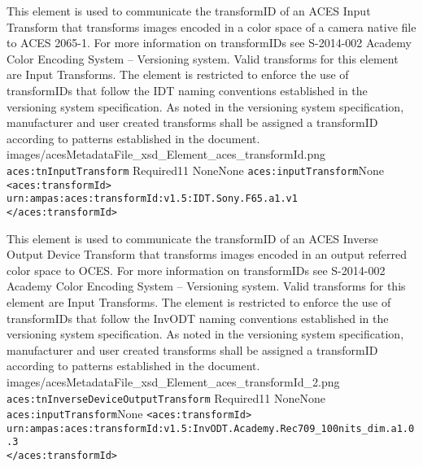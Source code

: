         {This element is used to communicate the transformID of an ACES Input Transform that transforms images encoded in a color space of a camera native file to ACES 2065-1.  For more information on transformIDs see S-2014-002 Academy Color Encoding System -- Versioning system.  Valid transforms for this element are Input Transforms.  The element is restricted to enforce the use of transformIDs that follow the IDT naming conventions established in the versioning system specification.  As noted in the versioning system specification, manufacturer and user created transforms shall be assigned a transformID according to patterns established in the document.}
        {images/acesMetadataFile_xsd_Element_aces_transformId.png}
        {\texttt{aces:tnInputTransform}}
        {Required}{1}{1}
        {None}{None}
        {\texttt{aces:inputTransform}}{None}
        {\lstinline{<aces:transformId>} \\
        \lstinline{urn:ampas:aces:transformId:v1.5:IDT.Sony.F65.a1.v1} \\
        \lstinline{</aces:transformId>}}

        {This element is used to communicate the transformID of an ACES Inverse Output Device Transform that transforms images encoded in an output referred color space to OCES.  For more information on transformIDs see S-2014-002 Academy Color Encoding System -- Versioning system.  Valid transforms for this element are Input Transforms.  The element is restricted to enforce the use of transformIDs that follow the InvODT naming conventions established in the versioning system specification.  As noted in the versioning system specification, manufacturer and user created transforms shall be assigned a transformID according to patterns established in the document.}
        {images/acesMetadataFile_xsd_Element_aces_transformId_2.png}
        {\texttt{aces:tnInverseDeviceOutputTransform}}
        {Required}{1}{1}
        {None}{None}
        {\texttt{aces:inputTransform}}{None}
        {\lstinline{<aces:transformId>} \\
        \lstinline{urn:ampas:aces:transformId:v1.5:InvODT.Academy.Rec709_100nits_dim.a1.0.3} \\
        \lstinline{</aces:transformId>}}

